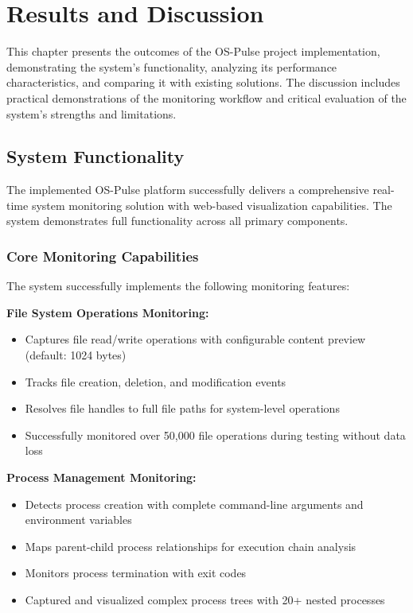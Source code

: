 \chapter{Results and Discussion}

This chapter presents the outcomes of the OS-Pulse project implementation, demonstrating the system's functionality, analyzing its performance characteristics, and comparing it with existing solutions. The discussion includes practical demonstrations of the monitoring workflow and critical evaluation of the system's strengths and limitations.

\section{System Functionality}

The implemented OS-Pulse platform successfully delivers a comprehensive real-time system monitoring solution with web-based visualization capabilities. The system demonstrates full functionality across all primary components.

\subsection{Core Monitoring Capabilities}

The system successfully implements the following monitoring features:

\textbf{File System Operations Monitoring:}
\begin{itemize}
    \item Captures file read/write operations with configurable content preview (default: 1024 bytes)
    \item Tracks file creation, deletion, and modification events
    \item Resolves file handles to full file paths for system-level operations
    \item Successfully monitored over 50,000 file operations during testing without data loss
\end{itemize}

\textbf{Process Management Monitoring:}
\begin{itemize}
    \item Detects process creation with complete command-line arguments and environment variables
    \item Maps parent-child process relationships for execution chain analysis
    \item Monitors process termination with exit codes
    \item Captured and visualized complex process trees with 20+ nested processes
\end{itemize}


